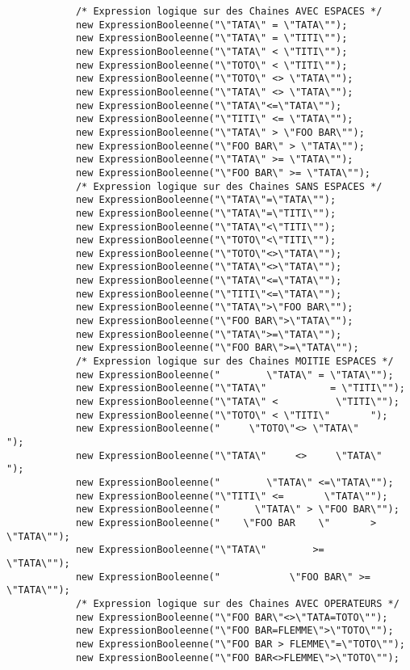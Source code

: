 \begin{enum}
\begin{verbatim}
            /* Expression logique sur des Chaines AVEC ESPACES */
            new ExpressionBooleenne("\"TATA\" = \"TATA\"");
            new ExpressionBooleenne("\"TATA\" = \"TITI\"");
            new ExpressionBooleenne("\"TATA\" < \"TITI\"");
            new ExpressionBooleenne("\"TOTO\" < \"TITI\"");
            new ExpressionBooleenne("\"TOTO\" <> \"TATA\"");
            new ExpressionBooleenne("\"TATA\" <> \"TATA\"");
            new ExpressionBooleenne("\"TATA\"<=\"TATA\"");
            new ExpressionBooleenne("\"TITI\" <= \"TATA\"");
            new ExpressionBooleenne("\"TATA\" > \"FOO BAR\"");
            new ExpressionBooleenne("\"FOO BAR\" > \"TATA\"");
            new ExpressionBooleenne("\"TATA\" >= \"TATA\"");
            new ExpressionBooleenne("\"FOO BAR\" >= \"TATA\"");
            /* Expression logique sur des Chaines SANS ESPACES */
            new ExpressionBooleenne("\"TATA\"=\"TATA\"");
            new ExpressionBooleenne("\"TATA\"=\"TITI\"");
            new ExpressionBooleenne("\"TATA\"<\"TITI\"");
            new ExpressionBooleenne("\"TOTO\"<\"TITI\"");
            new ExpressionBooleenne("\"TOTO\"<>\"TATA\"");
            new ExpressionBooleenne("\"TATA\"<>\"TATA\"");
            new ExpressionBooleenne("\"TATA\"<=\"TATA\"");
            new ExpressionBooleenne("\"TITI\"<=\"TATA\"");
            new ExpressionBooleenne("\"TATA\">\"FOO BAR\"");
            new ExpressionBooleenne("\"FOO BAR\">\"TATA\"");
            new ExpressionBooleenne("\"TATA\">=\"TATA\"");
            new ExpressionBooleenne("\"FOO BAR\">=\"TATA\"");
            /* Expression logique sur des Chaines MOITIE ESPACES */
            new ExpressionBooleenne("        \"TATA\" = \"TATA\"");
            new ExpressionBooleenne("\"TATA\"           = \"TITI\"");
            new ExpressionBooleenne("\"TATA\" <          \"TITI\"");
            new ExpressionBooleenne("\"TOTO\" < \"TITI\"       ");
            new ExpressionBooleenne("     \"TOTO\"<> \"TATA\"       ");
            new ExpressionBooleenne("\"TATA\"     <>     \"TATA\"     ");
            new ExpressionBooleenne("        \"TATA\" <=\"TATA\"");
            new ExpressionBooleenne("\"TITI\" <=       \"TATA\"");
            new ExpressionBooleenne("      \"TATA\" > \"FOO BAR\"");
            new ExpressionBooleenne("    \"FOO BAR    \"       > \"TATA\"");
            new ExpressionBooleenne("\"TATA\"        >=         \"TATA\"");
            new ExpressionBooleenne("            \"FOO BAR\" >=      \"TATA\"");
            /* Expression logique sur des Chaines AVEC OPERATEURS */
            new ExpressionBooleenne("\"FOO BAR\"<>\"TATA=TOTO\"");
            new ExpressionBooleenne("\"FOO BAR=FLEMME\">\"TOTO\"");
            new ExpressionBooleenne("\"FOO BAR > FLEMME\"=\"TOTO\"");
            new ExpressionBooleenne("\"FOO BAR<>FLEMME\">\"TOTO\"");


\end{verbatim}
\end{enum}
